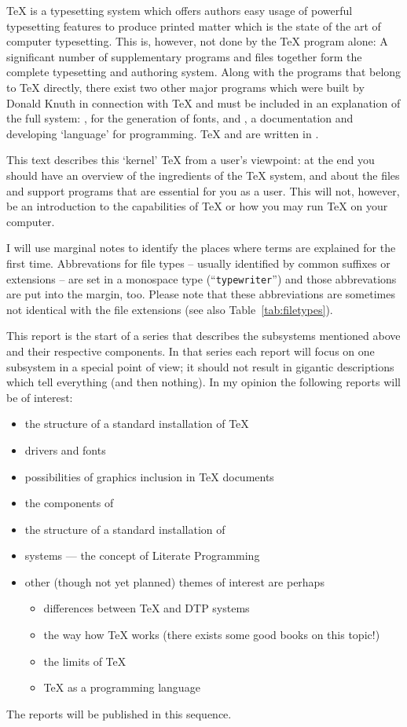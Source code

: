 \TeX{} is a typesetting system which offers authors easy usage of
powerful typesetting features to produce printed matter which is the
state of the art of computer typesetting. This is, however, not done by the
\TeX{} program alone: A significant number of supplementary
programs and files together form the complete typesetting and
authoring system. Along with the programs that belong to \TeX{}
directly, there exist two other major programs which were built by {\sc
Donald Knuth} in connection with \TeX{} and must be included in an
explanation of the full system: \MF{}, for the generation of fonts,
and \WEB{}, a documentation and developing `language' for programming.
\TeX{} and \MF{} are written in \WEB{}.

This text describes this `kernel' \TeX{} from a user's viewpoint: at
the end you should have an overview of the ingredients of the \TeX{}
system, and about the files and support programs that are essential
for you as a user. This will not, however, be an introduction to the
capabilities of \TeX{} or how you may run \TeX{} on your computer.

I will use marginal notes to identify the places where terms are
explained for the first time. Abbrevations for file types -- usually
identified by common suffixes or extensions -- are set in a monospace
type (``{\tt typewriter\/}'') and those abbrevations are put into the
margin, too. Please note that these abbreviations are sometimes not
identical with the file extensions (see also
Table~\ref{tab:filetypes}).

This report is the start of a series that describes the subsystems
mentioned above and their respective components. In that series each
report will focus on one subsystem in a special point of view; it
should not result in gigantic descriptions which tell everything (and
then nothing). In my opinion the following reports will be of
interest:
 \begin{itemize}

\item the structure of a standard installation of \TeX{}
\item \DVI{} drivers and fonts
\item possibilities of graphics inclusion in \TeX{} documents
\item the components of \MF{}
\item the structure of a standard installation of \MF{}
\item \WEB{} systems --- the concept of Literate Programming
\item other (though not yet planned) themes of interest are perhaps
\begin{itemize}
\item differences between \TeX{} and DTP systems
\item the way how \TeX{} works (there exists some good books on this topic!)
\item the limits of \TeX{}
\item \TeX{} as a programming language
\end{itemize}

 \end{itemize}
 The reports will be published in this sequence.




